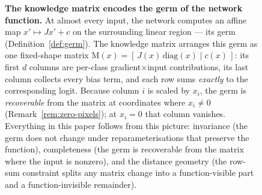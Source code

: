 \begin{figure}[!ht]
\caption{\textbf{The knowledge matrix encodes the germ of the network function.} At almost every
input, the network computes an affine map $x' \mapsto J x' + c$ on the surrounding linear
region --- its germ (Definition~\ref{def:germ}). The knowledge matrix arranges this germ as
one fixed-shape matrix
$\mathrm{M}(x)=[\,J(x)\,\mathrm{diag}(x) \mid c(x)\,]$: its first $d$ columns are per-class
gradient$\times$input contributions, its last column collects every bias term, and each row
sums \emph{exactly} to the corresponding logit. Because column $i$ is scaled by $x_i$, the
germ is \emph{recoverable} from the matrix at coordinates where $x_i\neq0$
(Remark~\ref{rem:zero-pixels}); at $x_i=0$ that column vanishes. Everything in this paper
follows from this picture: invariance (the germ does not change under reparameterisations that
preserve the function), completeness (the germ is recoverable from the matrix where the input
is nonzero), and the distance geometry
(the row-sum constraint splits any matrix change into a function-visible part and a
function-invisible remainder).}
\label{fig:germ}
\end{figure}
